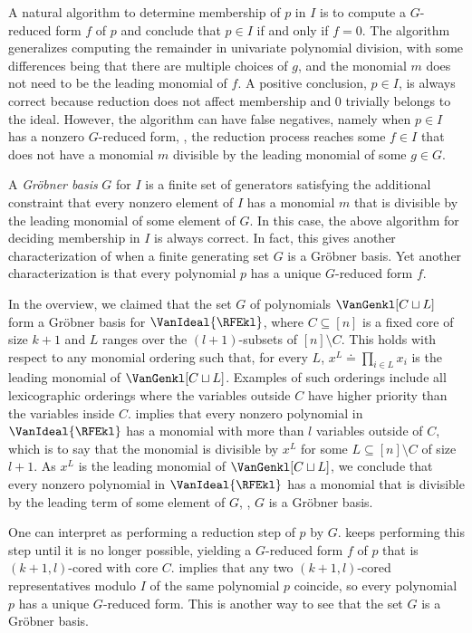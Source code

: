 \documentclass{toc}
\begin{document}
A natural algorithm to determine membership of $p$ in $I$ is to compute a $G$-reduced form $f$ of $p$ and conclude that $p \in I$ if and only if $f=0$. The algorithm generalizes computing the remainder in univariate polynomial division, with some differences being that there are multiple choices of $g$, and the monomial $m$ does not need to be the leading monomial of $f$. A positive conclusion, $p \in I$, is always correct because reduction does not affect membership and $0$ trivially belongs to the ideal. However, the algorithm can have false negatives, namely when $p \in I$ has a nonzero $G$-reduced form, \ie, the reduction process reaches some $f \in I$ that does not have a monomial $m$ divisible by the leading monomial of some $g \in G$. 

A \emph{Gr\"obner basis} $G$ for $I$ is a finite set of generators satisfying the additional constraint that every nonzero element of $I$ has a monomial $m$ that is divisible by the leading monomial of some element of $G$. In this case, the above algorithm for deciding membership in $I$ is always correct. In fact, this gives another characterization of when a finite generating set $G$ is a Gr\"obner basis. Yet another characterization is that every polynomial $p$ has a unique $G$-reduced form $f$.

In the overview, we claimed that the set $G$ of polynomials $\VanGenkl[C \sqcup L]$ form a Gröbner basis for $\VanIdeal{\RFEkl}$, where $C \subseteq [n]$ is a fixed core of size $k+1$ and $L$ ranges over the $(l+1)$-subsets of $[n] \setminus C$. This holds with respect to any monomial ordering such that, for every $L$, $x^L \doteq \prod_{i \in L} x_i$ is the leading monomial of $\VanGenkl[C \sqcup L]$. Examples of such orderings include all lexicographic orderings where the variables outside $C$ have higher priority than the variables inside $C$.  implies that every nonzero polynomial in $\VanIdeal{\RFEkl}$ has a monomial with more than $l$ variables outside of $C$, which is to say that the monomial is divisible by $x^L$ for some $L \subseteq [n] \setminus C$ of size $l+1$. As $x^L$ is the leading monomial of $\VanGenkl[C \sqcup L]$, we conclude that every nonzero polynomial in $\VanIdeal{\RFEkl}$ has a monomial that is divisible by the leading term of some element of $G$, \ie, $G$ is a Gröbner basis. 

One can interpret  as performing a reduction step of $p$ by $G$.  keeps performing this step until it is no longer possible, yielding a $G$-reduced form $f$ of $p$ that is $(k+1,l)$-cored with core $C$.  implies that any two $(k+1,l)$-cored representatives modulo $I$ of the same polynomial $p$ coincide, so every polynomial $p$ has a unique $G$-reduced form. This is another way to see that the set $G$ is a Gr\"obner basis. 
\end{document}
